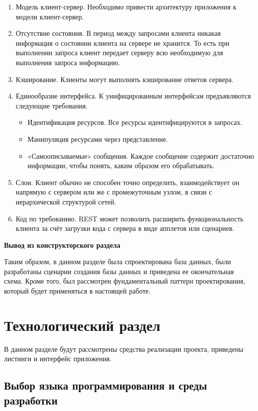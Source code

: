 \documentclass[a4paper,14pt]{article}
\begin{document}
\begin{enumerate}
	\item Модель клиент-сервер. Необходимо привести архитектуру приложения к модели клиент-сервер.
	\item Отсутствие состояния. В период между запросами клиента никакая информация о состоянии клиента на сервере не хранится. То есть при выполнении запроса клиент передает серверу всю необходимую для выполнения запроса информацию.
	\item Кэширование. Клиенты могут выполнять кэширование ответов сервера.
	\item Единообразие интерфейса. К унифицированным интерфейсам предъявляются следующие требования.
	\begin{itemize}
		\item Идентификация ресурсов. Все ресурсы идентифицируются в запросах.
		\item Манипуляция ресурсами через представление. 
		\item «Самоописываемые» сообщения. Каждое сообщение содержит достаточно информации, чтобы понять, каким образом его обрабатывать.
	\end{itemize}
	\item Слои. Клиент обычно не способен точно определить, взаимодействует он напрямую с сервером или же с промежуточным узлом, в связи с иерархической структурой сетей.
	\item Код по требованию. REST может позволить расширить функциональность клиента за счёт загрузки кода с сервера в виде апплетов или сценариев.
\end{enumerate}

\textbf{Вывод из конструкторского раздела}

Таким образом, в данном разделе была спроектирована база данных, были разработаны сценарии создания базы данных и приведена ее окончательная схема. Кроме того, был рассмотрен фундаментальный паттерн проектирования, который будет применяться в настоящей работе.

\newpage
\section{Технологический раздел}

В данном разделе будут рассмотрены средства реализации проекта, приведены листинги и интерфейс приложения.

\subsection{Выбор языка программирования и среды разработки}
\end{document}
